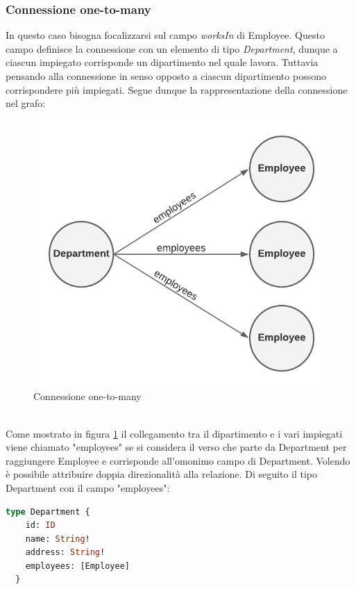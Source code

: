 \subsubsection*{Connessione one-to-many}
In questo caso bisogna focalizzarsi sul campo \textit{worksIn} di Employee. Questo campo definisce la connessione con un elemento di tipo \textit{Department}, dunque a ciascun impiegato corrisponde un dipartimento nel quale lavora. Tuttavia pensando alla connessione in senso opposto a ciascun dipartimento possono corrispondere più impiegati. Segue dunque la rappresentazione della connessione nel grafo:\\

\begin{figure}[!h]
\centering
\includegraphics[width=0.4\linewidth]{immagini/one_to_many.pdf}
\caption{Connessione one-to-many}
\label{one-to-many}
\end{figure}
\mbox{}\\
Come mostrato in figura \ref{one-to-many} il collegamento tra il dipartimento e i vari impiegati viene chiamato "employees" se si considera il verso che parte da Department per raggiungere Employee e corrisponde all'omonimo campo di Department. Volendo è possibile attribuire doppia direzionalità alla relazione. Di seguito il tipo Department con il campo "employees":
\begin{lstlisting}[language=GraphQL,]
  type Department {
    id: ID
    name: String!
    address: String!
    employees: [Employee]
  }
\end{lstlisting}

